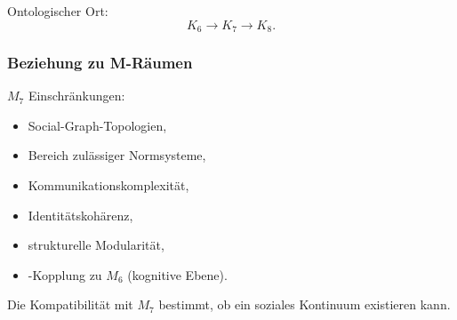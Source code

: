 Ontologischer Ort:
\[
K_6 \to K_7 \to K_8.
\]

\subsubsection{Beziehung zu M-Räumen}

$M_7$ Einschränkungen:
\begin{itemize}
    \item Social-Graph-Topologien,
    \item Bereich zulässiger Normsysteme,
    \item Kommunikationskomplexität,
    \item Identitätskohärenz,
    \item strukturelle Modularität,
    \item-Kopplung zu $M_6$ (kognitive Ebene).
\end{itemize}

Die Kompatibilität mit $M_7$ bestimmt, ob ein soziales Kontinuum existieren kann.
